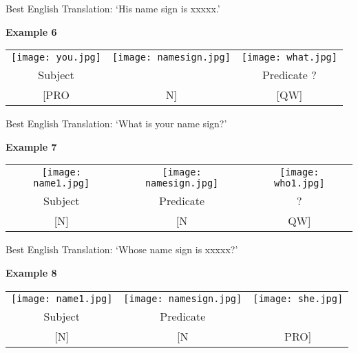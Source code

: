 \documentclass{tufte-book}
\begin{document}
Best English Translation: `His name sign is xxxxx.'


\vspace{0.25cm} \noindent \textbf{Example 6}
\begin{table*}[h!]

\begin{tabular}{c c | c}
\texttt{[image: you.jpg]} & \texttt{[image: namesign.jpg]} &\texttt{[image: what.jpg]} \\
\footnotesize Subject &  & \footnotesize Predicate ? \\
\footnotesize [PRO & \footnotesize N] & \footnotesize [QW] \\



\end{tabular}
\end{table*}

Best English Translation: `What is your name sign?'


\vspace{0.25cm} \noindent \textbf{Example 7}
\begin{table*}[h!]

\begin{tabular}{c | c c}
\texttt{[image: name1.jpg]} & \texttt{[image: namesign.jpg]} &\texttt{[image: who1.jpg]} \\
\footnotesize Subject &   \footnotesize Predicate & ? \\
\footnotesize [N] & \footnotesize [N & \footnotesize QW] \\



\end{tabular}
\end{table*}

Best English Translation: `Whose name sign is xxxxx?'
\newpage

 \noindent \textbf{Example 8}
\begin{table*}[h!]

\begin{tabular}{c | c c}
\texttt{[image: name1.jpg]} & \texttt{[image: namesign.jpg]} &\texttt{[image: she.jpg]} \\
\footnotesize Subject &   \footnotesize Predicate &  \\
\footnotesize [N] & \footnotesize [N & \footnotesize PRO] \\



\end{tabular}
\end{table*}
\end{document}
